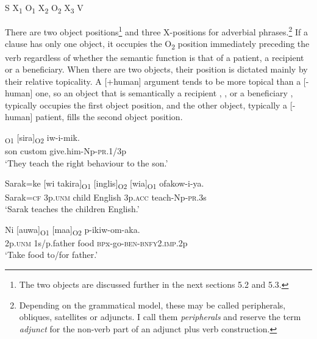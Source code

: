 \ea
S    X\textsubscript{1}  O\textsubscript{1}  X\textsubscript{2}  O\textsubscript{2}  X\textsubscript{3}  V
\z

There are two object positions\footnote{The two objects are discussed further in the next sections 5.2 and 5.3.}  and three X-positions for adverbial phrases.\footnote{Depending on the grammatical model, these may be called peripherals, obliques, satellites or adjuncts. I call them \textit{peripherals} and reserve the term \textit{adjunct} for the non-verb part of an adjunct plus verb construction.}  If a clause has only one object, it occupies the O\textsubscript{2} position immediately preceding the verb regardless of whether the semantic function is that of a patient, a recipient or a beneficiary. When there are two objects, their position is dictated mainly by their relative topicality. A [+human] argument tends to be more topical than a [\nobreakdash-human] one, so an object that is semantically a recipient , , or a beneficiary , typically occupies the first object position, and the other object, typically a [\nobreakdash-human] patient, fills the second object position. 

\ea%
\label{ex:5:x928}
\gll [Muuka]\textsubscript{O1}  [sira]\textsubscript{O2}  iw-i-mik. \\
     son  custom  give.him-Np-\textsc{pr}.1/3p \\
\glt `They teach the right behaviour to the son.'
\z

\ea%
\label{ex:5:x933}
\gll Sarak=ke  [wi  takira]\textsubscript{O1}  [inglis]\textsubscript{O2}  [wia]\textsubscript{O1}  ofakow-i-ya.{\footnotemark} \\
      Sarak=\textsc{cf}  3p.\textsc{unm}  child  English  3p.\textsc{acc}  teach-Np-\textsc{pr}.3s \\
\glt `Sarak teaches the children English.'
\z


\ea%
\label{ex:5:x916}
\gll Ni  [auwa]\textsubscript{O1}  [maa]\textsubscript{O2}  p-ikiw-om-aka.  \\
      2p.\textsc{unm}  1s/p.father  food  \textsc{bp}x-go-\textsc{ben}-\textsc{bnfy}2.\textsc{imp}.2p \\
\glt `Take food to/for father.'
\z

